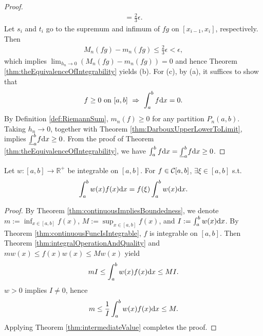 \begin{proof}
\begin{align*}
        =\frac{2}{3}\epsilon.
  \end{align*}
  Let $s_{i}$ and $t_{i}$ go to the supremum and infimum of $fg$
  on $[x_{i-1},x_{i}]$, respectively. Then
  \begin{align*}
    M_{n}(fg)-m_{n}(fg)\le \frac{2}{3}\epsilon < \epsilon,
  \end{align*}
  which implies $\lim_{h_{n}\rightarrow0}(M_{n}(fg)-m_{n}(fg))=0$
  and hence 
  Theorem \ref{thm:theEquivalenceOfIntegrability} yields (b).
  For (c), by (a), it suffices to show that
  \begin{align*}
    f\ge 0\text{ on }[a,b]\ \Rightarrow\
    \int_{a}^{b}f\mathrm{d} x=0.
  \end{align*}
  By Definition \ref{def:RiemannSum}, $m_{n}(f)\ge 0$ for any
  partition $P_{n}(a,b)$. Taking $h_{n}\rightarrow 0$,
  together with Theorem \ref{thm:DarbouxUpperLowerToLimit},
  implies $\underline{\int}_{a}^{b}f\mathrm{d} x\ge 0$. From the proof
  of Theorem \ref{thm:theEquivalenceOfIntegrability}, we have
  $\int_{a}^{b}f\mathrm{d} x=\underline{\int}_{a}^{b}f\mathrm{d} x\ge 0$.
\end{proof}

\begin{thm}
  \label{thm:integralMeanValue}
  Let $w:[a,b]\rightarrow \mathbb{R}^+$
  be integrable on $[a,b]$. For $f\in {\cal C}[a,b]$,
  $\exists \xi\in[a,b]$ s.t.
  \begin{equation}
    \label{eq:integralMeanValue}
    \int_a^b w(x)f(x)\mathrm{d} x = f(\xi) \int_a^b w(x)\mathrm{d} x.
  \end{equation}
\end{thm}
\begin{proof}
  By Theorem \ref{thm:continuousImpliesBoundedness},
  we denote $m:=\inf_{x\in[a,b]} f(x)$, $M:=\sup_{x\in[a,b]} f(x)$,
  and $I:=\int_a^b w(x)\mathrm{d} x$. By Theorem
  \ref{thm:continuousFuncIsIntegrable}, $f$ is integrable on $[a,b]$.
  Then Theorem \ref{thm:integralOperationAndQuality} and
    $m w(x)\le f(x)w(x) \le M w(x)$ yield
  \begin{equation*}
    m I \le \int_a^b w(x) f(x) \mathrm{d} x \le M I.
  \end{equation*}
  $w>0$ implies $I\ne 0$, hence
  \begin{equation*}
    m \le \frac{1}{I}\int_a^b w(x) f(x) \mathrm{d} x \le M.
  \end{equation*}
  Applying Theorem \ref{thm:intermediateValue}
   completes the proof.
\end{proof}

